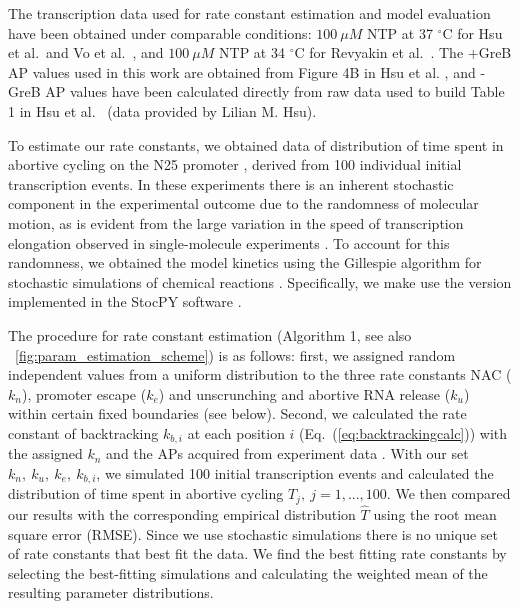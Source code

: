 The transcription data used for rate constant estimation and model evaluation
have been obtained under comparable conditions: $100\ \mu M$ NTP at 37
$^{\circ}$C for Hsu et al.\ and Vo et al.\
\cite{hsu_initial_2006,vo_vitro_2003-1}, and $100\ \mu M$ NTP at 34
$^{\circ}$C for Revyakin et al.\ \cite{revyakin_abortive_2006}. The +GreB AP
values used in this work are obtained from Figure 4B in Hsu et al.
\cite{hsu_initial_2006}, and -GreB AP values have been calculated directly
from raw data used to build Table 1 in Hsu et al.\ \cite{hsu_initial_2006}
(data provided by Lilian M. Hsu).



To estimate our rate constants, we obtained data of distribution of time spent
in abortive cycling on the N25 promoter \cite{revyakin_abortive_2006},
derived from 100 individual initial transcription events. In these
experiments there is an inherent stochastic component in the experimental
outcome due to the randomness of molecular motion, as is evident from
the large variation in the speed of transcription elongation observed in
single-molecule experiments \cite{adelman_single_2002,
tolic-norrelykke_diversity_2004}. To account for this randomness, we obtained
the model kinetics using the Gillespie algorithm for stochastic simulations of
chemical reactions \cite{gillespie_exact_1977}. Specifically, we make use the
version implemented in the StocPY software \cite{maarleveld_stochpy:_2013}.

The procedure for rate constant estimation (Algorithm 1, see also
\FIG~\ref{fig:param_estimation_scheme}) is as follows: first, we assigned
random independent values from a uniform distribution to the three rate
constants NAC ($k_n$), promoter escape ($k_e$) and unscrunching and abortive
RNA release ($k_u$) within certain fixed boundaries (see below). Second,
we calculated the rate constant of backtracking $k_{b,i}$ at each position
$i$ (Eq.~(\ref{eq:backtrackingcalc})) with the assigned $k_n$ and the APs 
acquired from experiment data \cite{hsu_initial_2006}. With our set ${k_n,\
k_u,\ k_e,\ k_{b,i}}$, we simulated 100 initial transcription events and
calculated the distribution of time spent in abortive cycling $T_j,\
j=1,...,100$. We then compared our results with the corresponding empirical
distribution $\hat T$ \cite{revyakin_abortive_2006} using the root mean
square error (RMSE). Since we use stochastic simulations there is no unique
set of rate constants that best fit the data. We find the best fitting rate
constants by selecting the best-fitting simulations and calculating the
weighted mean of the resulting parameter distributions.

